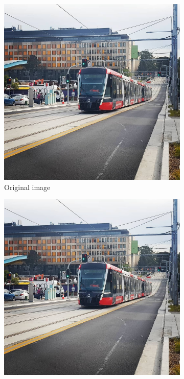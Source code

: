 \documentclass{article}
\begin{document}
\begin{figure}[!h]
  \centering
  \begin{subfigure}[b]{0.4\linewidth}
    \includegraphics[width=\linewidth]{light_rail.jpg}
    \caption{Original image}
  \end{subfigure}
  \begin{subfigure}[b]{0.4\linewidth}
    \includegraphics[width=\linewidth]{task3__light_rail_3.jpg}

\end{subfigure}
\end{figure}
\end{document}
